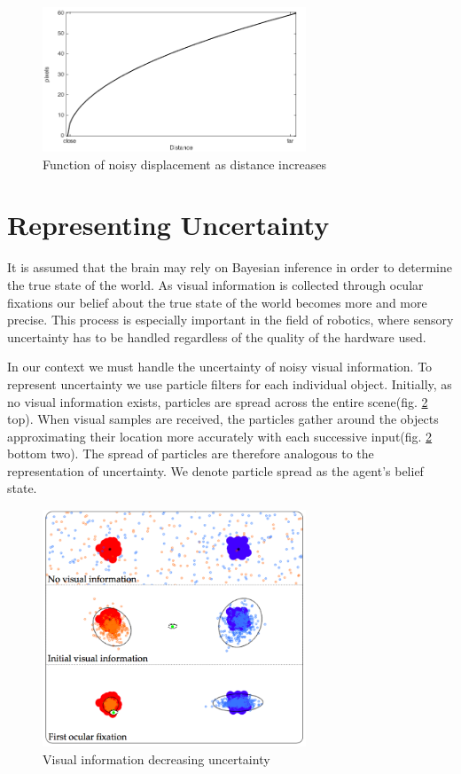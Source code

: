\documentclass[11]{article}
\begin{document}
\begin{figure}[h]
	\centering
	\includegraphics[width=0.7\textwidth]{Noise.png}
	\caption{Function of noisy displacement as distance increases}
	\label{fig:noise}
\end{figure}
 
\section{Representing Uncertainty}
It is assumed that the brain may rely on Bayesian inference in order to determine the true state of the world. As visual information is collected through ocular fixations our belief about the true state of the world becomes more and more precise. This process is especially important in the field of robotics, where sensory uncertainty has to be handled regardless of the quality of the hardware used.  

In our context we must handle the uncertainty of noisy visual information. To represent uncertainty we use particle filters for each individual object. Initially, as no visual information exists, particles are spread across the entire scene(fig. \ref{fig:uncertainty} top). When visual samples are received, the particles gather around the objects approximating their location more accurately with each successive input(fig. \ref{fig:uncertainty} bottom two). The spread of particles are therefore analogous to the representation of uncertainty. We denote particle spread as the agent's belief state. 

\begin{figure}[h]
	\centering
	\includegraphics[width=0.7\textwidth]{uncertainty.png}
	\caption{Visual information decreasing uncertainty}
	\label{fig:uncertainty}
\end{figure}
\end{document}
